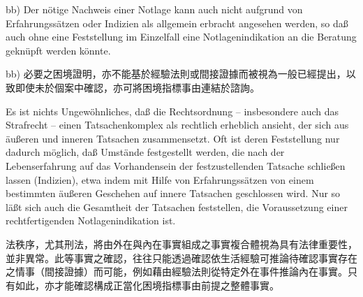 \documentclass[12pt]{article}
\begin{document}
\begin{sourcepara}[title={原文D.96}]
bb) Der nötige Nachweis einer Notlage kann auch nicht aufgrund von Erfahrungssätzen oder Indizien als allgemein erbracht angesehen werden, so daß auch ohne eine Feststellung im Einzelfall eine Notlagenindikation an die Beratung geknüpft werden könnte.
\end{sourcepara}
\begin{transpara}
bb) 必要之困境證明，亦不能基於經驗法則或間接證據而被視為一般已經提出，以致即使未於個案中確認，亦可將困境指標事由連結於諮詢。
\end{transpara}

\begin{sourcepara}[title={原文D.97}]
Es ist nichts Ungewöhnliches, daß die Rechtsordnung -- insbesondere auch das Strafrecht -- einen Tatsachenkomplex als rechtlich erheblich ansieht, der sich aus äußeren und inneren Tatsachen zusammensetzt. Oft ist deren Feststellung nur dadurch möglich, daß Umstände festgestellt werden, die nach der Lebenserfahrung auf das Vorhandensein der festzustellenden Tatsache schließen lassen (Indizien), etwa indem mit Hilfe von Erfahrungssätzen von einem bestimmten äußeren Geschehen auf innere Tatsachen geschlossen wird. Nur so läßt sich auch die Gesamtheit der Tatsachen feststellen, die Voraussetzung einer rechtfertigenden Notlagenindikation ist.
\end{sourcepara}
\begin{transpara}
法秩序，尤其刑法，將由外在與內在事實組成之事實複合體視為具有法律重要性，並非異常。此等事實之確認，往往只能透過確認依生活經驗可推論待確認事實存在之情事（間接證據）而可能，例如藉由經驗法則從特定外在事件推論內在事實。只有如此，亦才能確認構成正當化困境指標事由前提之整體事實。
\end{transpara}
\end{document}
